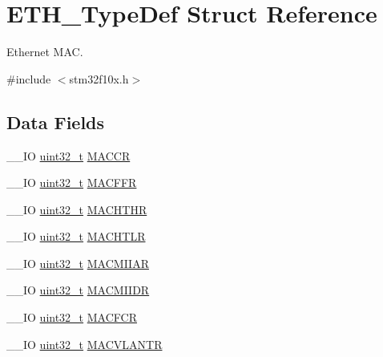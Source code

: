 \hypertarget{struct_e_t_h___type_def}{\section{E\-T\-H\-\_\-\-Type\-Def Struct Reference}
\label{struct_e_t_h___type_def}
}


Ethernet M\-A\-C.  




{\ttfamily \#include $<$stm32f10x.\-h$>$}

\subsection*{Data Fields}
\begin{DoxyCompactItemize}
\item 
\-\_\-\-\_\-\-I\-O \hyperlink{stdint_8h_a435d1572bf3f880d55459d9805097f62}{uint32\-\_\-t} \hyperlink{struct_e_t_h___type_def_a68d7e7c68b5b8adcf7b2b96bc1eea7d9}{M\-A\-C\-C\-R}
\item 
\-\_\-\-\_\-\-I\-O \hyperlink{stdint_8h_a435d1572bf3f880d55459d9805097f62}{uint32\-\_\-t} \hyperlink{struct_e_t_h___type_def_afdf573860dd5dcd13f2b6b19dcb92cc1}{M\-A\-C\-F\-F\-R}
\item 
\-\_\-\-\_\-\-I\-O \hyperlink{stdint_8h_a435d1572bf3f880d55459d9805097f62}{uint32\-\_\-t} \hyperlink{struct_e_t_h___type_def_ace541cc94118ec2db7c930a44960aa18}{M\-A\-C\-H\-T\-H\-R}
\item 
\-\_\-\-\_\-\-I\-O \hyperlink{stdint_8h_a435d1572bf3f880d55459d9805097f62}{uint32\-\_\-t} \hyperlink{struct_e_t_h___type_def_a22bd30c653a4c1c8f46a59e0a821dcf8}{M\-A\-C\-H\-T\-L\-R}
\item 
\-\_\-\-\_\-\-I\-O \hyperlink{stdint_8h_a435d1572bf3f880d55459d9805097f62}{uint32\-\_\-t} \hyperlink{struct_e_t_h___type_def_af697fcc940139f7dcb483766420852be}{M\-A\-C\-M\-I\-I\-A\-R}
\item 
\-\_\-\-\_\-\-I\-O \hyperlink{stdint_8h_a435d1572bf3f880d55459d9805097f62}{uint32\-\_\-t} \hyperlink{struct_e_t_h___type_def_a3d4c60bb689285b937c939b36a1233a3}{M\-A\-C\-M\-I\-I\-D\-R}
\item 
\-\_\-\-\_\-\-I\-O \hyperlink{stdint_8h_a435d1572bf3f880d55459d9805097f62}{uint32\-\_\-t} \hyperlink{struct_e_t_h___type_def_acdbe493d9d68ddfed4c758f0a7bde058}{M\-A\-C\-F\-C\-R}
\item 
\-\_\-\-\_\-\-I\-O \hyperlink{stdint_8h_a435d1572bf3f880d55459d9805097f62}{uint32\-\_\-t} \hyperlink{struct_e_t_h___type_def_a0792c8c170502e3466518d200ca297c3}{M\-A\-C\-V\-L\-A\-N\-T\-R}

\end{DoxyCompactItemize}
